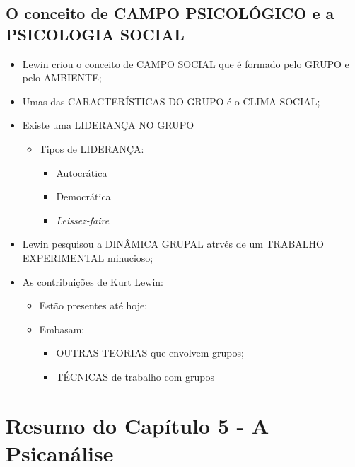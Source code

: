 \documentclass[
]{book}
\providecommand{\tightlist}{%
  \setlength{\itemsep}{0pt}\setlength{\parskip}{0pt}}
\begin{document}
\hypertarget{o-conceito-de-campo-psicoluxf3gico-e-a-psicologia-social}{%
\subsection{O conceito de CAMPO PSICOLÓGICO e a PSICOLOGIA SOCIAL}\label{o-conceito-de-campo-psicoluxf3gico-e-a-psicologia-social}}

\begin{itemize}
\tightlist
\item
  Lewin criou o conceito de CAMPO SOCIAL que é formado pelo GRUPO e pelo AMBIENTE;
\item
  Umas das CARACTERÍSTICAS DO GRUPO é o CLIMA SOCIAL;
\item
  Existe uma LIDERANÇA NO GRUPO

  \begin{itemize}
  \tightlist
  \item
    Tipos de LIDERANÇA:

    \begin{itemize}
    \tightlist
    \item
      Autocrática
    \item
      Democrática
    \item
      \emph{Leissez-faire}
    \end{itemize}
  \end{itemize}
\item
  Lewin pesquisou a DINÂMICA GRUPAL atrvés de um TRABALHO EXPERIMENTAL minucioso;
\item
  As contribuições de Kurt Lewin:

  \begin{itemize}
  \tightlist
  \item
    Estão presentes até hoje;
  \item
    Embasam:

    \begin{itemize}
    \tightlist
    \item
      OUTRAS TEORIAS que envolvem grupos;
    \item
      TÉCNICAS de trabalho com grupos
    \end{itemize}
  \end{itemize}
\end{itemize}

\hypertarget{resumo-do-capuxedtulo-5---a-psicanuxe1lise}{%
\section{Resumo do Capítulo 5 - A Psicanálise}\label{resumo-do-capuxedtulo-5---a-psicanuxe1lise}}
\end{document}
